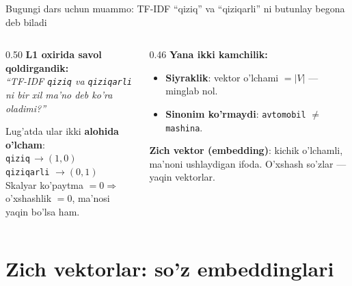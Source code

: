 \documentclass[aspectratio=169,11pt]{beamer}
\begin{document}
\begin{frame}{Bugungi dars uchun muammo: TF-IDF ``qiziq'' va ``qiziqarli'' ni butunlay begona deb biladi}
  \begin{columns}[T]
    \begin{column}{0.50\textwidth}
      \textbf{L1 oxirida savol qoldirgandik:}\\[4pt]
      \small\textit{``TF-IDF \texttt{qiziq} va \texttt{qiziqarli} ni
      bir xil ma'no deb ko'ra oladimi?''}\\[6pt]
      \begin{tcolorbox}[warnbox,title=Javob: yo'q!,top=2pt,bottom=2pt]
        \small
        Lug'atda ular ikki \textbf{alohida o'lcham}:\\[3pt]
        \texttt{qiziq}\;\;\;\,$\to (1, 0)$\\
        \texttt{qiziqarli} $\to (0, 1)$\\[3pt]
        Skalyar ko'paytma $= 0 \Rightarrow$ o'xshashlik $= 0$,
        ma'nosi yaqin bo'lsa ham.
      \end{tcolorbox}
    \end{column}
    \begin{column}{0.46\textwidth}
      \textbf{Yana ikki kamchilik:}\\[4pt]
      \small
      \begin{itemize}\setlength\itemsep{3pt}
        \item \textbf{Siyraklik}: vektor o'lchami $=|V|$ ---
              minglab nol.
        \item \textbf{Sinonim ko'rmaydi}: \texttt{avtomobil}
              $\ne$ \texttt{mashina}.
      \end{itemize}
      \vspace{5pt}
      \begin{tcolorbox}[okbox,title=Bugungi yechim,top=2pt,bottom=2pt]
        \footnotesize
        \textbf{Zich vektor (embedding)}: kichik o'lchamli, ma'noni
        ushlaydigan ifoda. O'xshash so'zlar --- yaqin vektorlar.
      \end{tcolorbox}
    \end{column}
  \end{columns}
\end{frame}

\section[Embeddinglar]{Zich vektorlar: so'z embeddinglari}
\end{document}
